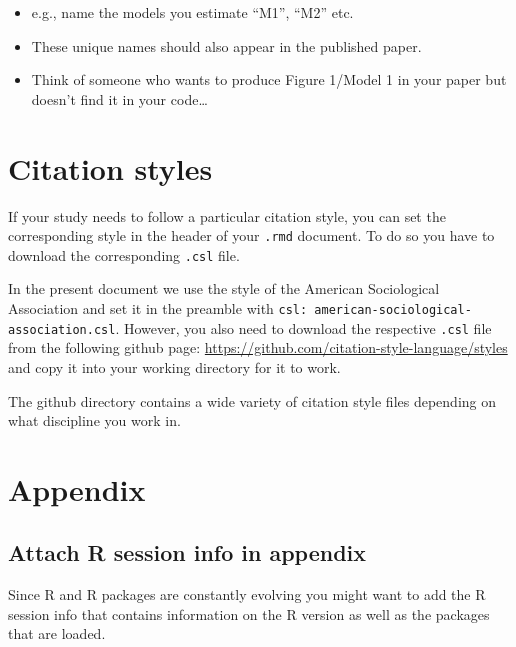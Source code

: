 \documentclass[
  12pt,
]{article}
\providecommand{\tightlist}{%
  \setlength{\itemsep}{0pt}\setlength{\parskip}{0pt}}
\begin{document}
\begin{itemize}
  \begin{itemize}
  \tightlist
  \item
    e.g., name the models you estimate ``M1'', ``M2'' etc.
  \item
    These unique names should also appear in the published paper.
  \item
    Think of someone who wants to produce Figure 1/Model 1 in your paper but doesn't find it in your code\ldots{}
  \end{itemize}
\end{itemize}

\hypertarget{citation-styles}{%
\section{Citation styles}\label{citation-styles}}

If your study needs to follow a particular citation style, you can set the corresponding style in the header of your \texttt{.rmd} document. To do so you have to download the corresponding \texttt{.csl} file.

In the present document we use the style of the American Sociological Association and set it in the preamble with \texttt{csl:\ american-sociological-association.csl}. However, you also need to download the respective \texttt{.csl} file from the following github page: \url{https://github.com/citation-style-language/styles} and copy it into your working directory for it to work.

The github directory contains a wide variety of citation style files depending on what discipline you work in.

\hypertarget{appendix}{%
\section{Appendix}\label{appendix}}

\hypertarget{sec:rsessioninfo}{%
\subsection{Attach R session info in appendix}\label{sec:rsessioninfo}}

Since R and R packages are constantly evolving you might want to add the R session info that contains information on the R version as well as the packages that are loaded.
\end{document}
